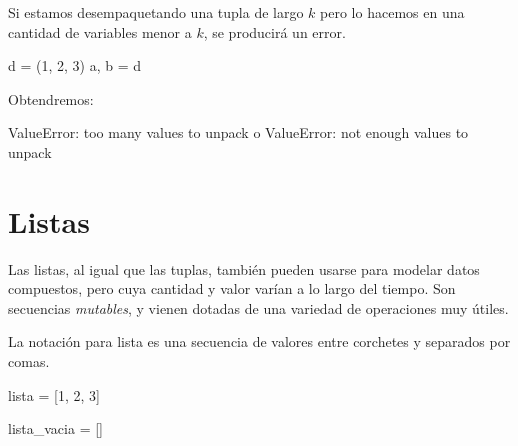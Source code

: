 \documentclass[
  letterpaper,
  DIV=11,
  numbers=noendperiod]{scrreprt}
\newenvironment{Shaded}{\begin{snugshade}}{\end{snugshade}}
\newcommand{\DecValTok}[1]{\textcolor[rgb]{0.68,0.00,0.00}{#1}}
\newcommand{\NormalTok}[1]{\textcolor[rgb]{0.00,0.23,0.31}{#1}}
\newcommand{\OperatorTok}[1]{\textcolor[rgb]{0.37,0.37,0.37}{#1}}
\begin{document}
\begin{tcolorbox}[enhanced jigsaw, colframe=quarto-callout-warning-color-frame, opacityback=0, opacitybacktitle=0.6, bottomrule=.15mm, toprule=.15mm, coltitle=black, breakable, colback=white, leftrule=.75mm, titlerule=0mm, bottomtitle=1mm, toptitle=1mm, rightrule=.15mm, title=\textcolor{quarto-callout-warning-color}{\faExclamationTriangle}\hspace{0.5em}{¡Cuidado!}, arc=.35mm, left=2mm, colbacktitle=quarto-callout-warning-color!10!white]

Si estamos desempaquetando una tupla de largo \(k\) pero lo hacemos en
una cantidad de variables menor a \(k\), se producirá un error.

\begin{Shaded}
\begin{Highlighting}[]
\NormalTok{d }\OperatorTok{=}\NormalTok{ (}\DecValTok{1}\NormalTok{, }\DecValTok{2}\NormalTok{, }\DecValTok{3}\NormalTok{)}
\NormalTok{a, b }\OperatorTok{=}\NormalTok{ d}
\end{Highlighting}
\end{Shaded}

Obtendremos:

\begin{Shaded}
\begin{Highlighting}[]
\NormalTok{ValueError: too many values to unpack}
\NormalTok{o}
\NormalTok{ValueError: not enough values to unpack}
\end{Highlighting}
\end{Shaded}

\end{tcolorbox}

\hypertarget{listas}{%
\section{Listas}\label{listas}}

Las listas, al igual que las tuplas, también pueden usarse para modelar
datos compuestos, pero cuya cantidad y valor varían a lo largo del
tiempo. Son secuencias \emph{mutables}, y vienen dotadas de una variedad
de operaciones muy útiles.

La notación para lista es una secuencia de valores entre corchetes y
separados por comas.

\begin{Shaded}
\begin{Highlighting}[]
\NormalTok{lista }\OperatorTok{=}\NormalTok{ [}\DecValTok{1}\NormalTok{, }\DecValTok{2}\NormalTok{, }\DecValTok{3}\NormalTok{]}

\NormalTok{lista\_vacia }\OperatorTok{=}\NormalTok{ []}
\end{Highlighting}
\end{Shaded}
\end{document}
